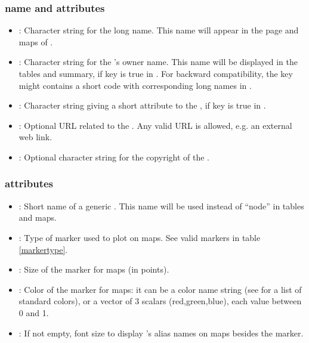 \subsubsection{ name and attributes}
\begin{itemize}

\item {}: Character string for the  long name. This name will appear in the  page and maps of .

\item {}: Character string for the 's owner name. This name will be displayed in the  tables and  summary, if  key is true in . For backward compatibility, the key might contains a short code with corresponding long names in .

%

\item {}: Character string giving a short attribute to the , if  key is true in .

\item {}: Optional URL related to the . Any valid URL is allowed, e.g. an external web link.

\item {}: Optional character string for the copyright of the .

\end{itemize}


\subsubsection{ attributes}
\begin{itemize}

\item {}: Short name of a generic . This name will be used instead of ``node'' in tables and maps.

\item {}: Type of marker used to plot  on maps. See valid markers in table \ref{markertype}.

\item {}: Size of the  marker for maps (in points).

\item {}: Color of the  marker for maps: it can be a color name string (see  for a list of standard colors), or a vector of 3 scalars (red,green,blue), each value between 0 and 1.

\item {}: If not empty, font size to display 's alias names on maps besides the marker.

\end{itemize}

